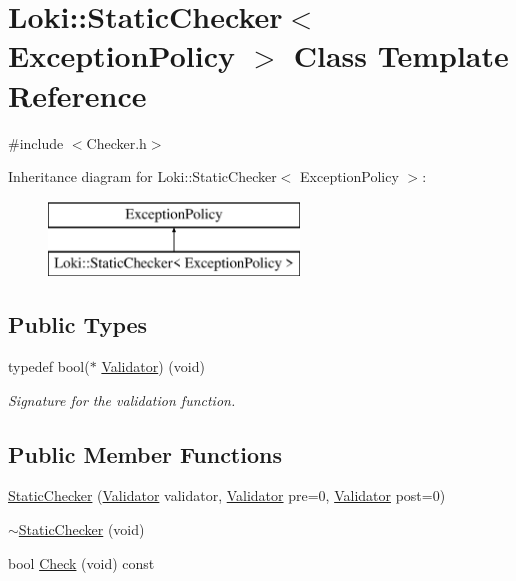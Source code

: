 \hypertarget{classLoki_1_1StaticChecker}{}\section{Loki\+:\+:Static\+Checker$<$ Exception\+Policy $>$ Class Template Reference}
\label{classLoki_1_1StaticChecker}


{\ttfamily \#include $<$Checker.\+h$>$}

Inheritance diagram for Loki\+:\+:Static\+Checker$<$ Exception\+Policy $>$\+:\begin{figure}[H]
\begin{center}
\leavevmode
\includegraphics[height=2.000000cm]{classLoki_1_1StaticChecker}
\end{center}
\end{figure}
\subsection*{Public Types}
\begin{DoxyCompactItemize}
\item 
\hypertarget{classLoki_1_1StaticChecker_a0569fd17467e7258926bf033a3da8823}{}typedef bool($\ast$ \hyperlink{classLoki_1_1StaticChecker_a0569fd17467e7258926bf033a3da8823}{Validator}) (void)\label{classLoki_1_1StaticChecker_a0569fd17467e7258926bf033a3da8823}

\begin{DoxyCompactList}\small\item\em Signature for the validation function. \end{DoxyCompactList}\end{DoxyCompactItemize}
\subsection*{Public Member Functions}
\begin{DoxyCompactItemize}
\item 
\hyperlink{classLoki_1_1StaticChecker_a03eca9af5c834a019115f519994d84d7}{Static\+Checker} (\hyperlink{structValidator}{Validator} validator, \hyperlink{structValidator}{Validator} pre=0, \hyperlink{structValidator}{Validator} post=0)
\item 
\hyperlink{classLoki_1_1StaticChecker_ac34b548bb197793f0e393e0448b07b6f}{$\sim$\+Static\+Checker} (void)
\item 
bool \hyperlink{classLoki_1_1StaticChecker_ad8e80dcf79a603395ecc9d5b2fe91491}{Check} (void) const 
\end{DoxyCompactItemize}


